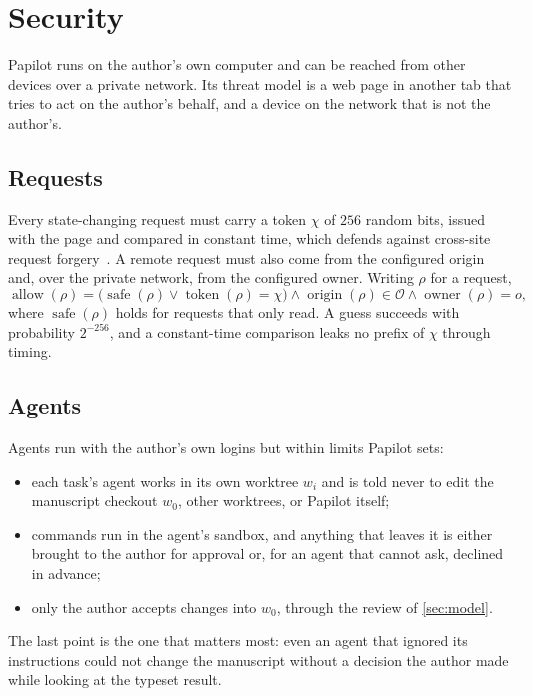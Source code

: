 \section{Security}
\label{sec:security}

Papilot runs on the author's own computer and can be reached from other
devices over a private network. Its threat model is a web page in another tab
that tries to act on the author's behalf, and a device on the network that is
not the author's.

\subsection{Requests}

Every state-changing request must carry a token $\chi$ of $256$ random bits,
issued with the page and compared in constant time, which defends against
cross-site request forgery~\cite{barth2008}. A remote request must also come
from the configured origin and, over the private network, from the configured
owner. Writing $\rho$ for a request,
\begin{equation}
  \operatorname{allow}(\rho) =
  \bigl(\operatorname{safe}(\rho) \lor \operatorname{token}(\rho) = \chi\bigr)
  \land \operatorname{origin}(\rho) \in \mathcal{O}
  \land \operatorname{owner}(\rho) = o ,
  \label{eq:allow}
\end{equation}
where $\operatorname{safe}(\rho)$ holds for requests that only read. A guess
succeeds with probability $2^{-256}$, and a constant-time comparison leaks no
prefix of $\chi$ through timing.

\subsection{Agents}

Agents run with the author's own logins but within limits Papilot sets:
\begin{itemize}
  \item each task's agent works in its own worktree $w_i$ and is told never to
    edit the manuscript checkout $w_0$, other worktrees, or Papilot itself;
  \item commands run in the agent's sandbox, and anything that leaves it is
    either brought to the author for approval or, for an agent that cannot
    ask, declined in advance;
  \item only the author accepts changes into $w_0$, through the review of
    \cref{sec:model}.
\end{itemize}
The last point is the one that matters most: even an agent that ignored its
instructions could not change the manuscript without a decision the author
made while looking at the typeset result.
